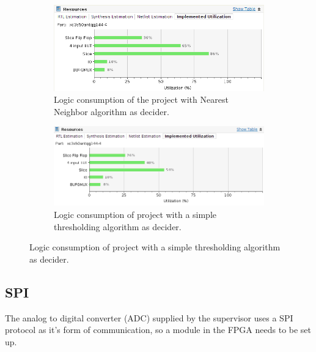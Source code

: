 \begin{figure}[H]
 \centering
\setlength{\belowcaptionskip}{5pt}

\begin{subfigure}[b]{0.70\textwidth}
\centering
\includegraphics[width=\linewidth]{img/nearest_neighbor_optimized.png}
\caption{Logic consumption of the project with Nearest Neighbor algorithm as decider.}
\end{subfigure}

\begin{subfigure}[b]{0.70\textwidth}
\centering
\includegraphics[width=\linewidth]{img/thresholding.png}
\caption{Logic consumption of project with a simple thresholding algorithm as decider.}
\end{subfigure}

\end{figure}

\subsection{SPI}
The analog to digital converter (ADC) supplied by the supervisor uses a SPI protocol as it's form of communication, so a module in the FPGA needs to be set up.

